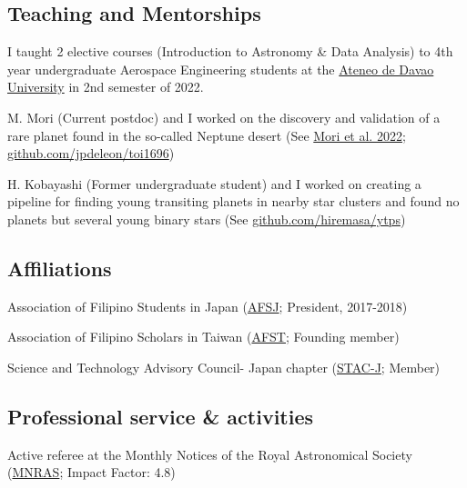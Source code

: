 \documentclass[12pt,letterpaper]{article}
\begin{document}
\subsection{Teaching and Mentorships}
\begin{list}{}{\cvlist}
    \item I taught 2 elective courses (Introduction to Astronomy \& Data Analysis) to 4th year undergraduate Aerospace Engineering students at the \href{http://sea.addu.edu.ph/programs/aerospace-engineering/}{Ateneo de Davao University} in 2nd semester of 2022. \\
    \item M. Mori (Current postdoc) and I worked on the discovery and validation of a rare planet found in the so-called Neptune desert (See \href{https://ui.adsabs.harvard.edu/abs/2022AJ....163..298M/abstract}{Mori et al. 2022}; \href{https://github.com/jpdeleon/toi1696}{github.com/jpdeleon/toi1696})
    \item H. Kobayashi (Former undergraduate student) and I worked on creating a pipeline for finding young transiting planets in nearby star clusters and found no planets but several young binary stars (See \href{https://github.com/hiremasa/ytps}{github.com/hiremasa/ytps})
\end{list}

\subsection{Affiliations}
\begin{list}{}{\cvlist}
    \item Association of Filipino Students in Japan (\href{https://www.facebook.com/afsjpage/}{AFSJ}; President, 2017-2018)
    \item Association of Filipino Scholars in Taiwan  (\href{https://www.facebook.com/AssocIskolar/}{AFST}; Founding member)
    \item Science and Technology Advisory Council- Japan chapter (\href{https://www.facebook.com/profile.php?id=100083271798519}{STAC-J}; Member)
\end{list}

\subsection{Professional service \& activities}
\begin{list}{}{\cvlist}
  \item Active referee at the Monthly Notices of the Royal Astronomical Society (\href{https://academic.oup.com/mnras}{MNRAS}; Impact Factor: 4.8)
\end{list}
\end{document}
